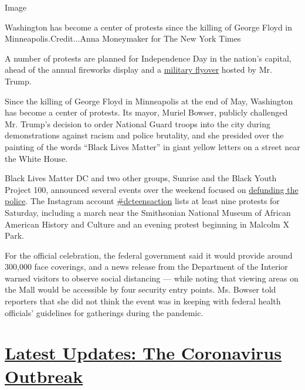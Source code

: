 Image

Washington has become a center of protests since the killing of George
Floyd in Minneapolis.Credit...Anna Moneymaker for The New York Times

A number of protests are planned for Independence Day in the nation's
capital, ahead of the annual fireworks display and a
\href{https://www.doi.gov/pressreleases/interior-presents-2020-independence-day-celebration-nations-capital}{military
flyover} hosted by Mr. Trump.

Since the killing of George Floyd in Minneapolis at the end of May,
Washington has become a center of protests. Its mayor, Muriel Bowser,
publicly challenged Mr. Trump's decision to order National Guard troops
into the city during demonstrations against racism and police brutality,
and she presided over the painting of the words ``Black Lives Matter''
in giant yellow letters on a street near the White House.

Black Lives Matter DC and two other groups, Sunrise and the Black Youth
Project 100, announced several events over the weekend focused on
\href{https://www.defundmpd.org/}{defunding the police}. The Instagram
account \href{https://www.instagram.com/dcteensaction/}{\#dcteensaction}
lists at least nine protests for Saturday, including a march near the
Smithsonian National Museum of African American History and Culture and
an evening protest beginning in Malcolm X Park.

For the official celebration, the federal government said it would
provide around 300,000 face coverings, and a news release from the
Department of the Interior warned visitors to observe social distancing
--- while noting that viewing areas on the Mall would be accessible by
four security entry points. Ms. Bowser told reporters that she did not
think the event was in keeping with federal health officials' guidelines
for gatherings during the pandemic.

\hypertarget{latest-updates-the-coronavirus-outbreak}{%
\section{\texorpdfstring{\href{https://www.nytimes3xbfgragh.onion/2020/08/21/world/covid-19-coronavirus.html?action=click\&pgtype=Article\&state=default\&region=MAIN_CONTENT_1\&context=storylines_live_updates}{Latest
Updates: The Coronavirus
Outbreak}}{Latest Updates: The Coronavirus Outbreak}}\label{latest-updates-the-coronavirus-outbreak}}

